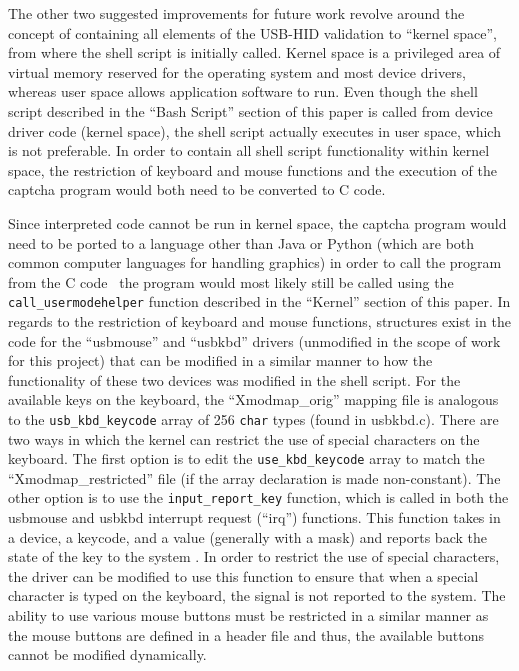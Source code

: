 \documentclass[pagenumbers]{ieee}
\begin{document}
The other two suggested improvements for future work revolve around the concept of containing all elements of the USB-HID validation to ``kernel space'', from where the shell script is initially called. Kernel space is a privileged area of virtual memory reserved for the operating system and most device drivers, whereas user space allows application software to run. Even though the shell script described in the ``Bash Script'' section of this paper is called from device driver code (kernel space), the shell script actually executes in user space, which is not preferable. In order to contain all shell script functionality within kernel space, the restriction of keyboard and mouse functions and the execution of the captcha program would both need to be converted to C code. 

Since interpreted code cannot be run in kernel space, the captcha program would need to be ported to a language other than Java or Python (which are both common computer languages for handling graphics) in order to call the program from the C code \textemdash \ the program would most likely still be called using the \texttt{call\_usermodehelper} function described in the ``Kernel'' section of this paper. In regards to the restriction of keyboard and mouse functions, structures exist in the code for the ``usbmouse'' and ``usbkbd'' drivers (unmodified in the scope of work for this project) that can be modified in a similar manner to how the functionality of these two devices was modified in the shell script. For the available keys on the keyboard, the ``Xmodmap\_orig'' mapping file is  analogous to the \texttt{usb\_kbd\_keycode} array of 256 \texttt{char} types (found in usbkbd.c). There are two ways in which the kernel can restrict the use of special characters on the keyboard. The first option is to edit the \texttt{use\_kbd\_keycode} array to match the ``Xmodmap\_restricted'' file (if the array declaration is made non-constant). The other option is to use the \texttt{input\_report\_key} function, which is called in both the usbmouse and usbkbd interrupt request (``irq'') functions. This function takes in a device, a keycode, and a value (generally with a mask) and reports back the state of the key to the system \cite{input}
. In order to restrict the use of special characters, the driver can be modified to use this function to ensure that when a special character is typed on the keyboard, the signal is not reported to the system. The ability to use various mouse buttons must be restricted in a similar manner as the mouse buttons are defined in a header file and thus, the available buttons cannot be modified dynamically.
\end{document}
